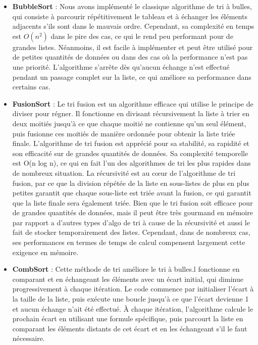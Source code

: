 \documentclass[a4paper,12pt]{article}
\begin{document}
\begin{itemize}

\item \textbf{BubbleSort} : Nous avons implémenté le classique algorithme de tri à bulles, qui consiste à parcourir répétitivement le tableau et à échanger les éléments adjacents s'ils sont dans le mauvais ordre. Cependant, sa complexité en temps est $O(n^2)$ dans le pire des cas, ce qui le rend peu performant pour de grandes listes. Néanmoins, il est facile à implémenter et peut être utilisé pour de petites quantités de données ou dans des cas où la performance n'est pas une priorité. L'algorithme s'arrête dès qu'aucun échange n'est effectué pendant un passage complet sur la liste, ce qui améliore sa performance dans certains cas. \\

\item \textbf{FusionSort} : Le tri fusion est un algorithme efficace qui utilise le principe de diviser pour régner. Il fonctionne en divisant récursivement la liste à trier en deux moitiés jusqu'à ce que chaque moitié ne contienne qu'un seul élément, puis fusionne ces moitiés de manière ordonnée pour obtenir la liste triée finale.
L'algorithme de tri fusion est apprécié pour sa stabilité, sa rapidité et son efficacité sur de grandes quantités de données. Sa complexité temporelle est O(n log n), ce qui en fait l'un des algorithmes de tri les plus rapides dans de nombreux situation.
La récursivité est au cœur de l'algorithme de tri fusion, par ce que la division répétée de la liste en sous-listes de plus en plus petites garantit que chaque sous-liste est triée avant la fusion, ce qui garantit que la liste finale sera également triée.
Bien que le tri fusion soit efficace pour de grandes quantités de données, mais  il peut être très gourmand en mémoire par rapport a d’autres types d’algo de tri à cause de la récursivité et aussi le fait de stocker temporairement des listes. Cependant, dans de nombreux cas, ses performances en termes de temps de calcul compensent largement cette exigence en mémoire.\\

\item \textbf{CombSort} : Cette méthode de tri améliore le tri à bulles.l fonctionne en comparant et en échangeant  les éléments avec un écart initial, qui diminue progressivement à chaque itération. Le code commence par initialiser l'écart à la taille de la liste, puis exécute une boucle jusqu'à ce que l'écart devienne 1 et aucun échange n'ait été effectué. À chaque itération, l'algorithme calcule le prochain écart en utilisant une formule spécifique, puis parcourt la liste en comparant les éléments distants de cet écart et en les échangeant s’il le faut nécessaire. \\


\end{itemize}
\end{document}
